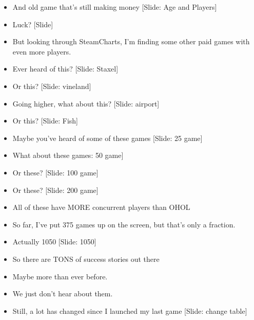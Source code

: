 \documentclass[12pt]{article}
\begin{document}
{\begin{itemize}
\item And old game that's still making money [Slide:  Age and Players]

\item Luck?  [Slide]

\item But looking through SteamCharts, I'm finding some other paid games with even more players.

\item Ever heard of this?  [Slide:  Staxel]

\item Or this?  [Slide: vineland]

\item Going higher, what about this? [Slide: airport]

\item Or this? [Slide: Fish]

\item Maybe you've heard of some of these games [Slide: 25 game]

\item What about these games: 50 game]

\item Or these? [Slide: 100 game]

\item Or these? [Slide: 200 game]

\item All of these have MORE concurrent players than OHOL

\item So far, I've put 375 games up on the screen, but that's only a fraction.

\item Actually 1050 [Slide:  1050]

\item So there are TONS of success stories out there

\item Maybe more than ever before.

\item We just don't hear about them.

\item Still, a lot has changed since I launched my last game [Slide: change table]


\end{itemize}

}
\end{document}
